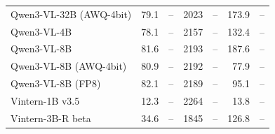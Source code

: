 \begin{table}[t]
\begin{tabular}{lrrrrrr}
Qwen3-VL-32B (AWQ-4bit) & 79.1 & – & 2023 & – & 173.9 & – \\
Qwen3-VL-4B & 78.1 & – & 2157 & – & 132.4 & – \\
Qwen3-VL-8B & 81.6 & – & 2193 & – & 187.6 & – \\
Qwen3-VL-8B (AWQ-4bit) & 80.9 & – & 2192 & – & 77.9 & – \\
Qwen3-VL-8B (FP8) & 82.1 & – & 2189 & – & 95.1 & – \\
Vintern-1B v3.5 & 12.3 & – & 2264 & – & 13.8 & – \\
Vintern-3B-R beta & 34.6 & – & 1845 & – & 126.8 & – \\
\bottomrule
\end{tabular}
\end{table}

